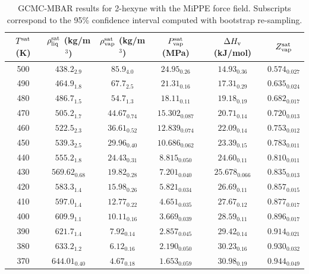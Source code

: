 \documentclass[journal=jctc,manuscript=article]{achemso}
\begin{document}
\begin{table}[htb!]
	\caption{GCMC-MBAR results for 2-hexyne with the MiPPE force field. Subscripts correspond to the 95\% confidence interval computed with bootstrap re-sampling.}
	\begin{center}
		\begin{tabular}{|c|c|c|c|c|c|}
			\hline
			$T^{\rm sat}$ (K) & $\rho_{\rm liq}^{\rm sat}$ (kg/m$^3$) & $\rho_{\rm vap}^{\rm sat}$ (kg/m$^3$) & $P_{\rm vap}^{\rm sat}$ (MPa) & $\Delta H_{\rm v}$ (kJ/mol) & $Z_{\rm vap}^{\rm sat}$ \\ \hline
			500 & $438.2_{2.9}$ & $85.9_{4.0}$ & $24.95_{0.26}$ & $14.93_{0.36}$ & $0.574_{0.027}$ \\
			490 & $464.9_{1.8}$ & $67.7_{2.5}$ & $21.31_{0.16}$ & $17.31_{0.29}$ & $0.635_{0.024}$ \\
			480 & $486.7_{1.5}$ & $54.7_{1.3}$ & $18.11_{0.11}$ & $19.18_{0.19}$ & $0.682_{0.017}$ \\
			470 & $505.2_{1.7}$ & $44.67_{0.74}$ & $15.302_{0.087}$ & $20.71_{0.14}$ & $0.720_{0.013}$ \\
			460 & $522.5_{2.3}$ & $36.61_{0.52}$ & $12.839_{0.074}$ & $22.09_{0.14}$ & $0.753_{0.012}$ \\
			450 & $539.3_{2.5}$ & $29.96_{0.40}$ & $10.686_{0.062}$ & $23.39_{0.15}$ & $0.783_{0.011}$ \\
			440 & $555.2_{1.8}$ & $24.43_{0.31}$ & $8.815_{0.050}$ & $24.60_{0.11}$ & $0.810_{0.011}$ \\
			430 & $569.62_{0.68}$ & $19.82_{0.28}$ & $7.201_{0.040}$ & $25.678_{0.066}$ & $0.835_{0.013}$ \\
			420 & $583.3_{1.4}$ & $15.98_{0.26}$ & $5.821_{0.034}$ & $26.69_{0.11}$ & $0.857_{0.015}$ \\
			410 & $597.0_{1.4}$ & $12.77_{0.22}$ & $4.651_{0.035}$ & $27.67_{0.12}$ & $0.877_{0.017}$ \\
			400 & $609.9_{1.1}$ & $10.11_{0.16}$ & $3.669_{0.039}$ & $28.59_{0.11}$ & $0.896_{0.017}$ \\
			390 & $621.7_{1.4}$ & $7.92_{0.14}$ & $2.857_{0.045}$ & $29.42_{0.14}$ & $0.914_{0.021}$ \\
			380 & $633.2_{1.2}$ & $6.12_{0.16}$ & $2.190_{0.050}$ & $30.23_{0.16}$ & $0.930_{0.032}$ \\
			370 & $644.01_{0.40}$ & $4.67_{0.18}$ & $1.653_{0.059}$ & $30.98_{0.19}$ & $0.944_{0.049}$ \\
			\hline
		\end{tabular}
	\end{center}
\end{table}
\end{document}
